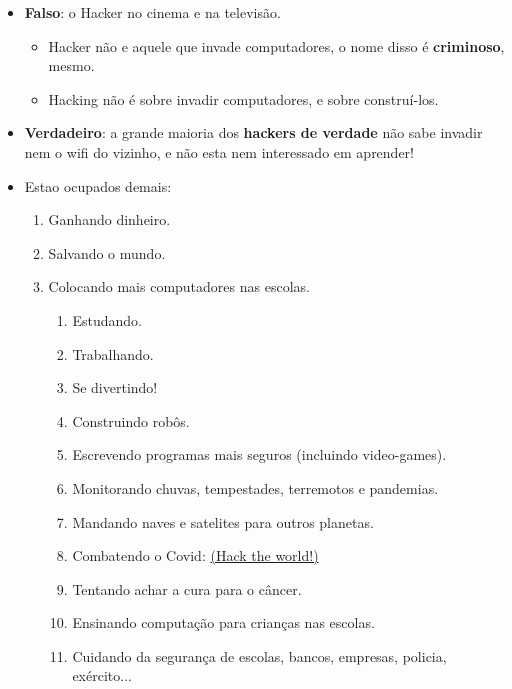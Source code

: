 \begin{multicols}{2}
	
	\Large
\begin{itemize}
	\item \textbf{Falso}: o Hacker no cinema e na televisão.
\begin{itemize}
	\item Hacker não e aquele que invade computadores, o nome disso é \textbf{criminoso}, mesmo.
	\item Hacking não é sobre invadir computadores, e sobre construí-los.
\end{itemize}
	\item \textbf{Verdadeiro}: a grande maioria dos \textbf{hackers de verdade} não sabe invadir nem o wifi do vizinho, e não esta nem interessado em aprender!
	\item Estao ocupados demais:
	\begin{enumerate}
		\item Ganhando dinheiro.
		\item Salvando o mundo.
		\item Colocando mais computadores nas escolas.
		\begin{enumerate}
			\item Estudando.
			\item Trabalhando.
			\item Se divertindo!
			\item Construindo robôs.
			\item Escrevendo programas mais seguros (incluindo video-games).
			\item Monitorando chuvas, tempestades, terremotos e pandemias.
			\item Mandando naves e satelites para outros planetas.
			\item 		Combatendo o Covid: \href{https://brasil.io/covid19/}{ (Hack the world!)}
			\item Tentando achar a cura para o câncer.
			\item Ensinando computação para crianças nas escolas.
			\item Cuidando da segurança de escolas, bancos, empresas, policia, exército...
		\end{enumerate}
	\end{enumerate}
\end{itemize}
\begin{enumerate}
	

\end{enumerate}
\end{multicols}
